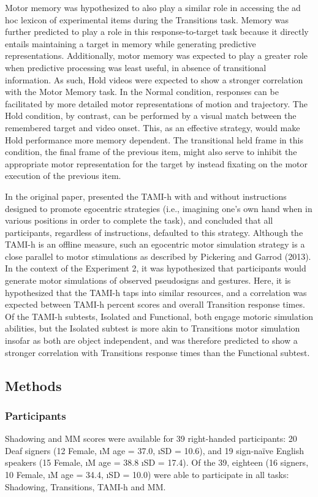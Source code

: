             Motor memory was hypothesized to also play a similar role in accessing the ad hoc lexicon of experimental items during the Transitions task. Memory was further predicted to play a role in this response-to-target task because it directly entails maintaining a target in memory while generating predictive representations. Additionally, motor memory was expected to play a greater role when predictive processing was least useful, in absence of transitional information. As such, Hold videos were expected to show a stronger correlation with the Motor Memory task. In the Normal condition, responses can be facilitated by more detailed motor representations of motion and trajectory. The Hold condition, by contrast, can be performed by a visual match between the remembered target and video onset. This, as an effective strategy, would make Hold performance more memory dependent. The transitional held frame in this condition, the final frame of the previous item, might also serve to inhibit the appropriate motor representation for the target by instead fixating on the motor execution of the previous item. \par
            In the original paper,  presented the TAMI-h with and without instructions designed to promote egocentric strategies (i.e., imagining one’s own hand when in various positions in order to complete the task), and concluded that all participants, regardless of instructions, defaulted to this strategy. Although the TAMI-h is an offline measure, such an egocentric motor simulation strategy is a close parallel to motor stimulations as described by Pickering and Garrod (2013). In the context of the Experiment 2, it was hypothesized that participants would generate motor simulations of observed pseudosigns and gestures. Here, it is hypothesized that the TAMI-h taps into similar resources, and a correlation was expected between TAMI-h percent scores and overall Transition response times. Of the TAMI-h subtests, Isolated and Functional, both engage motoric simulation abilities, but the Isolated subtest is more akin to Transitions motor simulation insofar as both are object independent, and was therefore predicted to show a stronger correlation with Transitions response times than the Functional subtest. \par 
    \subsection{Methods}
        \subsubsection{Participants}
            Shadowing and MM scores were available for 39 right-handed participants: 20 Deaf signers (12 Female, \i{M} age = 37.0, \i{SD} = 10.6), and 19 sign-na\"ive English speakers (15 Female, \i{M} age = 38.8 \i{SD} = 17.4). Of the 39, eighteen (16 signers, 10 Female, \i{M} age = 34.4, \i{SD} = 10.0) were able to participate in all tasks: Shadowing, Transitions, TAMI-h and MM. \par
